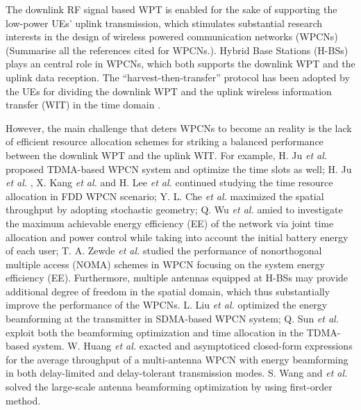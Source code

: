 \documentclass[12pt,draftcls,onecolumn,journal]{IEEEtran}
\begin{document}
The downlink RF signal based WPT is enabled for the sake of supporting the low-power UEs' uplink transmission, which stimulates substantial research interests in the design of wireless powered communication networks (WPCNs) \cite{wpcn_1,wpcn_2,wpcn_3,wpcn_4,wpcn_5,wpcn_6,wpcn_7,wpcn_8,wpcn_9,wpcn_10,wpcn_11} {\color{red} (Summarise all the references cited for WPCNs.)}. Hybrid Base Stations (H-BSs) plays an central role in WPCNs, which both supports the downlink WPT and the uplink data reception. The ``harvest-then-transfer'' protocol has been adopted by the UEs for dividing the downlink WPT and the uplink wireless information transfer (WIT) in the time domain \cite{wpcn_1}.

However, the main challenge that deters WPCNs to become an reality is the lack of efficient resource allocation schemes for striking a balanced performance between the downlink WPT and the uplink WIT. For example, H. Ju \textit{et al.} \cite{wpcn_1} proposed TDMA-based WPCN system and optimize the time slots as well; H. Ju \textit{et al.} \cite{wpcn_2}, X. Kang \textit{et al.} \cite{wpcn_4} and H. Lee \textit{et al.} \cite{wpcn_8} continued studying the time resource allocation in FDD WPCN scenario; Y. L. Che \textit{et al.} \cite{wpcn_3} maximized the spatial throughput by adopting stochastic geometry;  Q. Wu \textit{et al.} \cite{wpcn_6} amied to investigate the maximum achievable energy efficiency (EE) of the network via joint time allocation and power control while taking into account the initial battery energy of each user; T. A. Zewde \textit{et al.} \cite{wpcn_10} studied the performance of nonorthogonal multiple access (NOMA) schemes in WPCN focusing on the system energy efficiency (EE). Furthermore, multiple antennas equipped at H-BSs may provide additional degree of freedom in the spatial domain, which thus substantially improve the performance of the WPCNs. L. Liu \textit{et al.} \cite{wpcn_5} optimized the energy beamforming at the transmitter in SDMA-based WPCN system; Q. Sun \textit{et al.} \cite{wpcn_7} exploit both the beamforming optimization and time allocation in the TDMA-based system. W. Huang \textit{et al.} \cite{wpcn_9} exacted and asymptoticed closed-form expressions for the average throughput of a multi-antenna WPCN with energy beamforming in both delay-limited and delay-tolerant transmission modes. S. Wang and \textit{et al.} \cite{wpcn_11} solved the large-scale antenna beamforming optimization by using first-order method.
\end{document}
